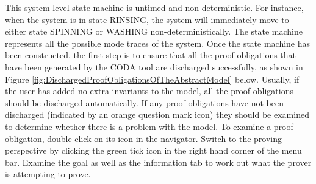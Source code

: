 This system-level state machine is untimed and non-deterministic. For instance, when the system is in state RINSING, the system will immediately move to either state SPINNING or WASHING non-deterministically. The state machine represents all the possible mode traces of the system.
Once the state machine has been constructed, the first step is to ensure that all the proof obligations that have been generated by the CODA tool are discharged successfully, as shown in Figure \ref{fig:DischargedProofObligationsOfTheAbstractModel} below. Usually, if the user has added no extra invariants to the model, all the proof obligations should be discharged automatically. If any proof obligations have not been discharged (indicated by an orange question mark icon) they should be examined to determine whether there is a problem with the model. To examine a proof obligation, double click on its icon in the navigator. Switch to the proving perspective by clicking the green tick icon in the right hand corner of the menu bar.  Examine the goal as well as the information tab to work out what the prover is attempting to prove.
 
